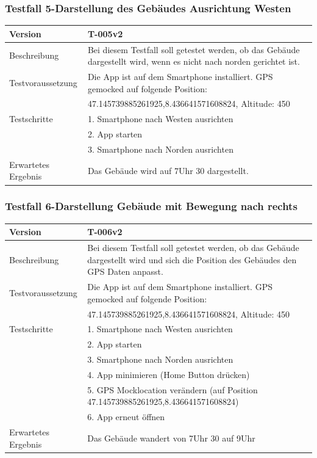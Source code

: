 \documentclass[a4paper]{scrreprt}
\begin{document}
\subsubsection{Testfall 5-Darstellung des Gebäudes Ausrichtung Westen}
\begin{tabularx}{\textwidth}{|l|X|}
\hline 
	Version &
	T-005v2 \\ 
\hline 
	Beschreibung & 
	Bei diesem Testfall soll getestet werden, ob das Gebäude dargestellt wird, wenn es nicht nach norden gerichtet ist. \\ 
\hline 
	Testvoraussetzung &
	Die App ist auf dem Smartphone installiert. GPS gemocked auf folgende Position: \\ &
		47.145739885261925,8.436641571608824, Altitude: 450 \\ 
\hline 
	Testschritte & 
		1. Smartphone nach Westen ausrichten \\ &
		2. App starten \\ &
		3. Smartphone nach Norden ausrichten \\
\hline
	Erwartetes Ergebnis &
	Das Gebäude wird auf 7Uhr 30 dargestellt. \\ 
\hline 
\end{tabularx}
\subsubsection{Testfall 6-Darstellung Gebäude mit Bewegung nach rechts}
\begin{tabularx}{\textwidth}{|l|X|}
\hline 
	Version &
	T-006v2 \\ 
\hline 
	Beschreibung & 
	Bei diesem Testfall soll getestet werden, ob das Gebäude dargestellt wird und sich die Position des Gebäudes den GPS Daten anpasst. \\ 
\hline 
	Testvoraussetzung &
	Die App ist auf dem Smartphone installiert. GPS gemocked auf folgende Position: \\ &
		47.145739885261925,8.436641571608824, Altitude: 450 \\ 
\hline 
	Testschritte & 
		1. Smartphone nach Westen ausrichten \\ &
		2. App starten \\ &
		3. Smartphone nach Norden ausrichten \\ &
		4. App minimieren (Home Button drücken) \\ &
		5. GPS Mocklocation verändern (auf Position 47.145739885261925,8.436641571608824) \\ &
		6. App erneut öffnen \\
\hline
	Erwartetes Ergebnis &
	Das Gebäude wandert von 7Uhr 30 auf 9Uhr \\ 
\hline 
\end{tabularx}
\end{document}
